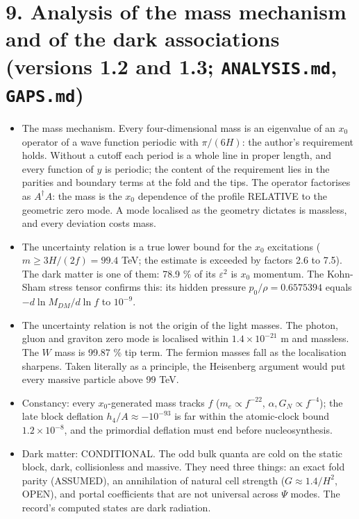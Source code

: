 \documentclass[11pt]{article}
\begin{document}
\section*{9. Analysis of the mass mechanism and of the dark associations (versions 1.2 and 1.3; \texttt{ANALYSIS.\allowbreak{}md}, \texttt{GAPS.\allowbreak{}md})}

\begin{itemize}
\item The mass mechanism. Every four-dimensional mass is an eigenvalue of an $x_0$ operator of a wave function periodic with $\pi/(6H)$: the author's requirement holds. Without a cutoff each period is a whole line in proper length, and every function of $y$ is periodic; the content of the requirement lies in the parities and boundary terms at the fold and the tips. The operator factorises as $A^\dagger A$: the mass is the $x_0$ dependence of the profile RELATIVE to the geometric zero mode. A mode localised as the geometry dictates is massless, and every deviation costs mass.
\item The uncertainty relation is a true lower bound for the $x_0$ excitations ($m \geq 3H/(2f) = 99.4$ TeV; the estimate is exceeded by factors 2.6 to 7.5). The dark matter is one of them: 78.9 \% of its $\varepsilon^2$ is $x_0$ momentum. The Kohn-Sham stress tensor confirms this: its hidden pressure $p_0/\rho = 0.6575394$ equals $-d\ln M_{DM}/d\ln f$ to $10^{-9}$.
\item The uncertainty relation is not the origin of the light masses. The photon, gluon and graviton zero mode is localised within $1.4\times10^{-21}$ m and massless. The $W$ mass is 99.87 \% tip term. The fermion masses fall as the localisation sharpens. Taken literally as a principle, the Heisenberg argument would put every massive particle above 99 TeV.
\item Constancy: every $x_0$-generated mass tracks $f$ ($m_e \propto f^{-22}$, $\alpha, G_N \propto f^{-4}$); the late block deflation $h_4/A \approx -10^{-93}$ is far within the atomic-clock bound $1.2\times10^{-8}$, and the primordial deflation must end before nucleosynthesis.
\item Dark matter: CONDITIONAL. The odd bulk quanta are cold on the static block, dark, collisionless and massive. They need three things: an exact fold parity (ASSUMED), an annihilation of natural cell strength ($G \approx 1.4/H^2$, OPEN), and portal coefficients that are not universal across $\Psi$ modes. The record's computed states are dark radiation.

\end{itemize}
\end{document}
